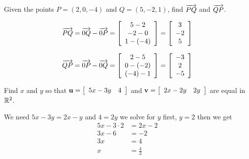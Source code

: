 \begin{enumialphparenastyle}

\begin{ex} Given the points $P=(2,0,-4)$ and $Q=(5,-2,1)$, find $\overrightarrow{PQ}$ and $\overrightarrow{QP}$.
 
\begin{sol}

\begin{equation*}
\overrightarrow{PQ}  = \overrightarrow{0Q} - \overrightarrow{0P}= \left[ \begin{array}{c}
5-2\\
 -2-0 \\
1-(-4)
\end{array}
\right] = \left[ \begin{array}{c}
3\\
 -2 \\
5
\end{array}
\right]
\end{equation*}

\begin{equation*}
\overrightarrow{QP}  = \overrightarrow{0P} - \overrightarrow{0Q}= \left[ \begin{array}{c}
2-5\\
 0-(-2) \\
(-4)-1
\end{array}
\right] = \left[ \begin{array}{c}
-3\\
 2 \\
-5
\end{array}
\right]
\end{equation*}

\end{sol}
\end{ex}

\begin{ex} Find $x$ and $y$ so that ${\bf u}= \left[ \begin{array}{cc}
5x-3y & 4
\end{array}
\right]$ and ${\bf v}= \left[ \begin{array}{cc}
2x-2y & 2y
\end{array}
\right]$ are equal in $\mathbb{R}^2$.
 
\begin{sol}

We need $5x-3y=2x-y$ and $4=2y$ we solve for $y$ first, $y=2$ then we get 
\begin{align*}
5x-3\cdot 2&=2x-2\\
3x-6&=-2\\
3x&=4\\
x&=\frac{4}{3}
\end{align*}



\end{sol}
\end{ex}
\end{enumialphparenastyle}
